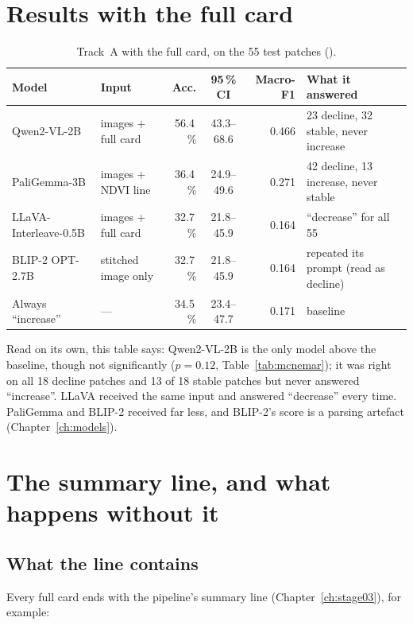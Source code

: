 \section{Results with the full card}

\begin{table}[H]
\centering
\caption{Track~A with the full card, on the 55 test patches ().}
\label{tab:trackA}
\small
\begin{tabularx}{\textwidth}{L{2.9cm}L{2.5cm}rcrY}
\toprule
Model & Input & Acc. & 95\,\% CI & Macro-F1 & What it answered \\
\midrule
Qwen2-VL-2B & images + full card & 56.4\,\% & 43.3--68.6 & 0.466 & 23 decline, 32 stable, never increase \\
PaliGemma-3B & images + NDVI line & 36.4\,\% & 24.9--49.6 & 0.271 & 42 decline, 13 increase, never stable \\
LLaVA-Interleave-0.5B & images + full card & 32.7\,\% & 21.8--45.9 & 0.164 & ``decrease'' for all 55 \\
BLIP-2 OPT-2.7B & stitched image only & 32.7\,\% & 21.8--45.9 & 0.164 & repeated its prompt (read as decline) \\
\midrule
Always ``increase'' & --- & 34.5\,\% & 23.4--47.7 & 0.171 & baseline \\
\bottomrule
\end{tabularx}
\end{table}

Read on its own, this table says: Qwen2-VL-2B is the only model above the baseline, though not significantly ($p = 0.12$, Table~\ref{tab:mcnemar}); it was right on all 18 decline patches and 13 of 18 stable patches but never answered ``increase''. LLaVA received the same input and answered ``decrease'' every time. PaliGemma and BLIP-2 received far less, and BLIP-2's score is a parsing artefact (Chapter~\ref{ch:models}).

\section{The summary line, and what happens without it}
\label{sec:summaryline}

\subsection{What the line contains}

Every full card ends with the pipeline's summary line (Chapter~\ref{ch:stage03}), for example:


